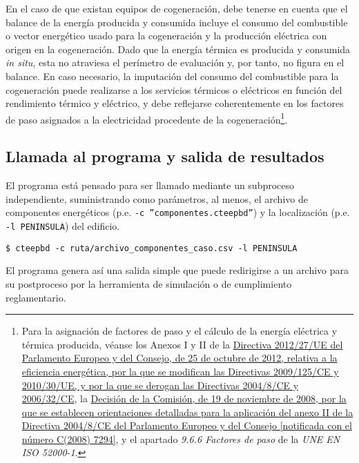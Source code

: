 \documentclass[10pt,notitlepage,oneside,a4paper]{article}
\begin{document}
En el caso de que existan equipos de cogeneración, debe tenerse en cuenta que el balance de la energía producida y consumida incluye el consumo del combustible o vector energético usado para la cogeneración y la producción eléctrica con origen en la cogeneración. Dado que la energía térmica es producida y consumida \textit{in situ}, esta no atraviesa el perímetro de evaluación y, por tanto, no figura en el balance. En caso necesario, la imputación del consumo del combustible para la cogeneración puede realizarse a los servicios térmicos o eléctricos en función del rendimiento térmico y eléctrico, y debe reflejarse coherentemente en los factores de paso asignados a la electricidad procedente de la cogeneración\footnote{Para la asignación de factores de paso y el cálculo de la energía eléctrica y térmica producida, véanse los Anexos I y II de la \href{https://www.boe.es/buscar/doc.php?id=DOUE-L-2012-82191}{Directiva 2012/27/UE del Parlamento Europeo y del Consejo, de 25 de octubre de 2012, relativa a la eficiencia energética, por la que se modifican las Directivas 2009/125/CE y 2010/30/UE, y por la que se derogan las Directivas 2004/8/CE y 2006/32/CE}, la \href{https://www.boe.es/buscar/doc.php?id=DOUE-L-2008-82509}{Decisión de la Comisión, de 19 de noviembre de 2008, por la que se establecen orientaciones detalladas para la aplicación del anexo II de la Directiva 2004/8/CE del Parlamento Europeo y del Consejo [notificada con el número C(2008) 7294]}, y el apartado \textit{9.6.6 Factores de paso} de la \textit{UNE EN ISO 52000-1}.}.


\subsection{Llamada al programa y salida de resultados}

El programa está pensado para ser llamado mediante un subproceso independiente, suministrando como parámetros, al menos, el archivo de componentes energéticos (p.e. \texttt{-c ''componentes.cteepbd''}) y la localización (p.e. \texttt{-l PENINSULA}) del edificio.

\begin{Verbatim}[fontsize=\small]
    $ cteepbd -c ruta/archivo_componentes_caso.csv -l PENINSULA
\end{Verbatim}

El programa genera así una salida simple que puede redirigirse a un archivo para su postproceso por la herramienta de simulación o de cumplimiento reglamentario.
\end{document}
